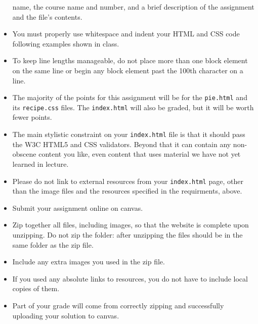 \documentclass{article}
\begin{document}
\begin{itemize}
      name, the course name and number, and a brief description of the
      assignment and the file's contents.
    \item You must properly use whitespace and indent your HTML and
      CSS code following examples shown in class.
    \item To keep line lengths
      manageable, do not place more than one block element on the same
      line or begin any block element past the 100th character on a
      line.
    \item The majority of the points for this assignment will be for
      the \verb|pie.html| and its \verb|recipe.css| files.  The
      \verb|index.html| will also be graded, but it will be worth
      fewer points.
    \item The main stylistic constraint on your
      \verb|index.html| file is that it should pass the W3C HTML5 and
      CSS validators. Beyond that it can contain any non-obscene
      content you like, even content that uses material we have not
      yet learned in lecture.
    \item Please do not link to external resources from your
      {\tt index.html} page, other than the image files and the
      resources specified in the requirments, above.
    \item Submit your assignment online on canvas.
    \item Zip together all files, including images, so that the
      website is complete upon unzipping.  Do not zip the folder:
      after unzipping the files should be in the same folder as the
      zip file.
    \item Include any extra images you used in the zip file.
    \item If you used any absolute links to resources, you do not have
      to include local copies of them.
    \item Part of your grade will come from correctly zipping and
      successfully uploading your solution to canvas.
  \end{itemize}
  
\end{document}
